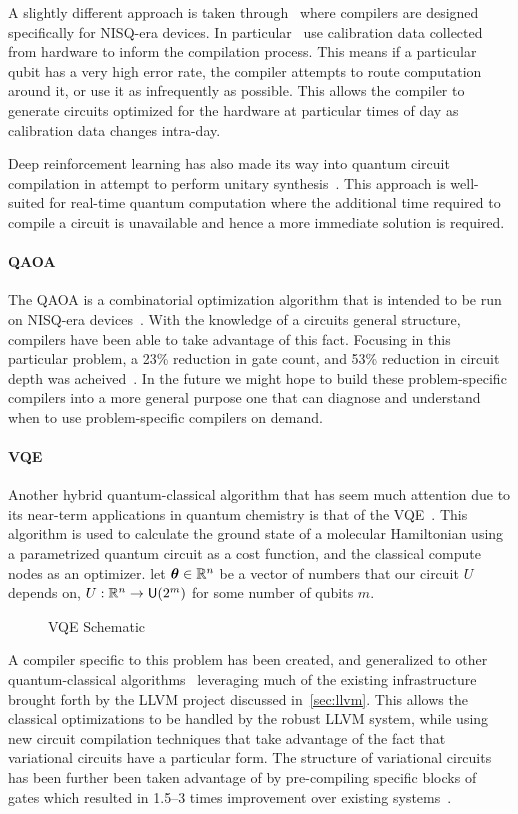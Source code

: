 A slightly different approach is taken through~\cite{nisq-comp,nisq-comp2,nisq-comp3} where compilers are designed specifically for \ac{NISQ}-era devices.
In particular~\cite{nisq-comp2,nisq-comp3} use calibration data collected from hardware to inform the compilation process.
This means if a particular qubit has a very high error rate, the compiler attempts to route computation around it, or use it as infrequently as possible.
This allows the compiler to generate circuits optimized for the hardware at particular times of day as calibration data changes intra-day.

Deep reinforcement learning has also made its way into quantum circuit compilation in attempt to perform unitary synthesis~\cite{deepcompile}.
This approach is well-suited for real-time quantum computation where the additional time required to compile a circuit is unavailable and hence a more immediate solution is required.

\paragraph{QAOA}
The \ac{QAOA} is a combinatorial optimization algorithm that is intended to be run on \ac{NISQ}-era devices~\cite{qaoa}.
With the knowledge of a circuits general structure, compilers have been able to take advantage of this fact.
Focusing in this particular problem, a 23\% reduction in gate count, and 53\% reduction in circuit depth was acheived~\cite{qaoa-compiler}.
In the future we might hope to build these problem-specific compilers into a more general purpose one that can diagnose and understand when to use problem-specific compilers on demand.

\paragraph{VQE}
Another hybrid quantum-classical algorithm that has seem much attention due to its near-term applications in quantum chemistry is that of the \ac{VQE}~\cite{vqe,vqe2}.
This algorithm is used to calculate the ground state of a molecular Hamiltonian using a parametrized quantum circuit as a cost function, and the classical compute nodes as an optimizer.
\Eg{} let $\boldsymbol{\theta} \in \mathbb{R}^n$ be a vector of numbers that our circuit $U$ depends on, \ie{} $U: \mathbb{R}^n \to \mathsf{U} (2^m)$ for some number of qubits $m$.
\begin{figure}[ht]
    \centering
    
    \caption{\acs{VQE} Schematic}\label{fig:vqe}
\end{figure}
A compiler specific to this problem has been created, and generalized to other quantum-classical algorithms~\cite{vqe-compiler} leveraging much of the existing infrastructure brought forth by the LLVM project discussed in~\cref{sec:llvm}.
This allows the classical optimizations to be handled by the robust LLVM system, while using new circuit compilation techniques that take advantage of the fact that variational circuits have a particular form.
The structure of variational circuits has been further been taken advantage of by pre-compiling specific blocks of gates which resulted in 1.5--3 times improvement over existing systems~\cite{vqe-partial}.

